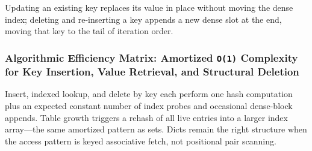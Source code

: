 Updating an existing key replaces its value in place without moving the dense index; deleting and re-inserting a key appends a new dense slot at the end, moving that key to the tail of iteration order.

\subsubsection{Algorithmic Efficiency Matrix: Amortized \texttt{O(1)} Complexity for Key Insertion, Value Retrieval, and Structural Deletion}

Insert, indexed lookup, and delete by key each perform one hash computation plus an expected constant number of index probes and occasional dense-block appends. Table growth triggers a rehash of all live entries into a larger index array---the same amortized pattern as sets. Dicts remain the right structure when the access pattern is keyed associative fetch, not positional pair scanning.
